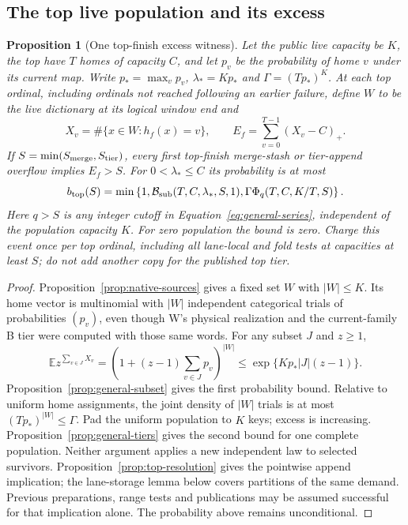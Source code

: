 \documentclass[11pt]{article}
\newtheorem{proposition}[theorem]{Proposition}
\theoremstyle{definition}
\theoremstyle{remark}
\newcommand{\E}{\mathbb E}
\begin{document}
\subsection{The top live population and its excess}
\label{sec:top-excess}
\begin{proposition}[One top-finish excess witness]
\label{prop:top-excess}
Let the public live capacity be $K$, the top have $T$ homes of capacity
$C$, and let $p_v$ be the probability of home $v$ under its current map.
Write $p_* = \max_v p_v$, $\lambda_*=Kp_*$ and
$\Gamma=(Tp_*)^K$. At each top ordinal, including ordinals not reached
following an earlier failure, define $W$ to be the live dictionary at its
logical window end and
\[
 X_v=\#\{x\in W:h_f(x)=v\},\qquad
 E_f=\sum_{v=0}^{T-1}(X_v-C)_+.
\]
If $S=\min(S_{\rm merge},S_{\rm tier})$, every first top-finish
merge-stash or tier-append overflow implies $E_f>S$. For
$0<\lambda_*\le C$ its probability is at most
\[
 b_{\rm top}(S)=\min\left\{1,
 \mathcal B_{\rm sub}(T,C,\lambda_*,S,1),
 \Gamma\Phi_{q}(T,C,K/T,S)\right\}.
\]
Here $q>S$ is any integer cutoff in Equation~\eqref{eq:general-series},
independent of the population capacity $K$.
For zero population the bound is zero. Charge this event once per top
ordinal, including all lane-local and fold tests at capacities at least
$S$; do not add another copy for the published top tier.
\end{proposition}
\begin{proof}
Proposition~\ref{prop:native-sources} gives a fixed set $W$ with $|W|\le K$.
Its home vector is multinomial with $|W|$ independent categorical trials
of probabilities $(p_v)$, even though W's physical realization and the
current-family B tier were computed with those same words. For any subset
$J$ and $z\ge1$,
\[
 \E z^{\sum_{v\in J}X_v}
 =\left(1+(z-1)\sum_{v\in J}p_v\right)^{|W|}
 \le\exp\{Kp_*|J|(z-1)\}.
\]
Proposition~\ref{prop:general-subset} gives the first probability bound.
Relative to uniform home assignments, the joint density of $|W|$ trials
is at most $(Tp_*)^{|W|}\le\Gamma$. Pad the uniform population to $K$
keys; excess is increasing. Proposition~\ref{prop:general-tiers} gives
the second bound for one complete population. Neither argument applies
a new independent law to selected survivors. Proposition~\ref{prop:top-resolution}
gives the pointwise append implication; the lane-storage lemma below
covers partitions of the same demand. Previous preparations, range tests
and publications may be assumed successful for that implication alone.
The probability above remains unconditional.
\end{proof}
\end{document}

